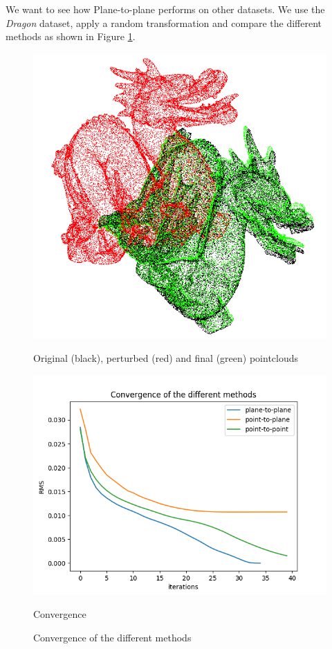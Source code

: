 \documentclass[11pt,letterpaper,leqno]{article}
\begin{document}
We want to see how Plane-to-plane performs on other datasets. We use the \textit{Dragon} dataset, apply a random transformation and compare the different methods as shown in Figure \ref{fig:comp_dragon}. 

\begin{figure}[ht!]
    \centering
    \begin{minipage}{0.4\linewidth}
        \includegraphics[width=\linewidth]{img/conv_dragon.png}
        \caption{Original (black), perturbed (red) and final (green) pointclouds}
        \end{minipage}\hfill
    \begin{minipage}{0.5\linewidth}
    \includegraphics[width=\linewidth]{img/comparison_dragon.png}
    \caption{Convergence}
    \end{minipage}
    \caption{Convergence of the different methods}
    \label{fig:comp_dragon}
\end{figure}
\end{document}
